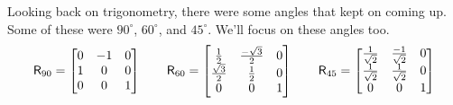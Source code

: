 Looking back on trigonometry, there were some angles that kept on
coming up. Some of these were $90^\circ$, $60^\circ$, and $45^\circ$.
We'll focus on these angles too.
\[
\mathsf{R}_{90} =
\begin{bmatrix}
0 & -1 & 0\\
1 & 0 & 0\\
0 & 0 & 1
\end{bmatrix}
\qquad 
\mathsf{R}_{60} =
\begin{bmatrix}
\frac{1}{2} & \frac{-\sqrt{3}}{2} & 0\\
\frac{\sqrt{3}}{2} & \frac{1}{2} & 0\\
0 & 0 & 1
\end{bmatrix}
\qquad
\mathsf{R}_{45} =
\begin{bmatrix}
\frac{1}{\sqrt{2}} & \frac{-1}{\sqrt{2}} & 0\\
\frac{1}{\sqrt{2}} & \frac{1}{\sqrt{2}} & 0\\
0 & 0 & 1
\end{bmatrix}
\]


